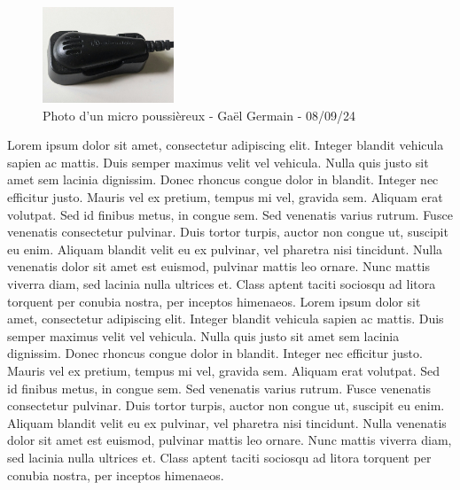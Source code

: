 \begin{figure}
    \centering
    \caption{Photo d'un micro poussièreux - Gaël Germain - 08/09/24}
    \includegraphics[width=0.35\textwidth]{images/micro_poussiereux.jpg}
\end{figure}
Lorem ipsum dolor sit amet, consectetur adipiscing elit. Integer blandit vehicula sapien ac mattis. Duis semper maximus velit vel vehicula.
Nulla quis justo sit amet sem lacinia dignissim. Donec rhoncus congue dolor in blandit. Integer nec efficitur justo. Mauris vel ex pretium,
tempus mi vel, gravida sem. Aliquam erat volutpat. Sed id finibus metus, in congue sem. Sed venenatis varius rutrum. Fusce venenatis
consectetur pulvinar. Duis tortor turpis, auctor non congue ut, suscipit eu enim. Aliquam blandit velit eu ex pulvinar, vel pharetra nisi
tincidunt. Nulla venenatis dolor sit amet est euismod, pulvinar mattis leo ornare. Nunc mattis viverra diam, sed lacinia nulla ultrices et.
Class aptent taciti sociosqu ad litora torquent per conubia nostra, per inceptos himenaeos.
Lorem ipsum dolor sit amet, consectetur adipiscing elit. Integer blandit vehicula sapien ac mattis. Duis semper maximus velit vel vehicula.
Nulla quis justo sit amet sem lacinia dignissim. Donec rhoncus congue dolor in blandit. Integer nec efficitur justo. Mauris vel ex pretium,
tempus mi vel, gravida sem. Aliquam erat volutpat. Sed id finibus metus, in congue sem. Sed venenatis varius rutrum. Fusce venenatis
consectetur pulvinar. Duis tortor turpis, auctor non congue ut, suscipit eu enim. Aliquam blandit velit eu ex pulvinar, vel pharetra nisi
tincidunt. Nulla venenatis dolor sit amet est euismod, pulvinar mattis leo ornare. Nunc mattis viverra diam, sed lacinia nulla ultrices et.
Class aptent taciti sociosqu ad litora torquent per conubia nostra, per inceptos himenaeos. 


